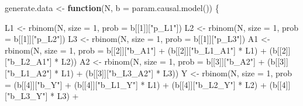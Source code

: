 \documentclass[
]{book}
\newenvironment{Shaded}{\begin{snugshade}}{\end{snugshade}}
\newcommand{\AttributeTok}[1]{\textcolor[rgb]{0.77,0.63,0.00}{#1}}
\newcommand{\ControlFlowTok}[1]{\textcolor[rgb]{0.13,0.29,0.53}{\textbf{#1}}}
\newcommand{\DecValTok}[1]{\textcolor[rgb]{0.00,0.00,0.81}{#1}}
\newcommand{\FunctionTok}[1]{\textcolor[rgb]{0.00,0.00,0.00}{#1}}
\newcommand{\NormalTok}[1]{#1}
\newcommand{\OtherTok}[1]{\textcolor[rgb]{0.56,0.35,0.01}{#1}}
\newcommand{\SpecialCharTok}[1]{\textcolor[rgb]{0.00,0.00,0.00}{#1}}
\newcommand{\StringTok}[1]{\textcolor[rgb]{0.31,0.60,0.02}{#1}}
\begin{document}
\begin{Shaded}
\begin{Highlighting}[]
\NormalTok{generate.data }\OtherTok{\textless{}{-}} \ControlFlowTok{function}\NormalTok{(N, }\AttributeTok{b =}  \FunctionTok{param.causal.model}\NormalTok{()) \{}
  
\NormalTok{  L1 }\OtherTok{\textless{}{-}} \FunctionTok{rbinom}\NormalTok{(N, }\AttributeTok{size =} \DecValTok{1}\NormalTok{, }\AttributeTok{prob =}\NormalTok{ b[[}\DecValTok{1}\NormalTok{]][}\StringTok{"p\_L1"}\NormalTok{]) }
\NormalTok{  L2 }\OtherTok{\textless{}{-}} \FunctionTok{rbinom}\NormalTok{(N, }\AttributeTok{size =} \DecValTok{1}\NormalTok{, }\AttributeTok{prob =}\NormalTok{ b[[}\DecValTok{1}\NormalTok{]][}\StringTok{"p\_L2"}\NormalTok{])}
\NormalTok{  L3 }\OtherTok{\textless{}{-}} \FunctionTok{rbinom}\NormalTok{(N, }\AttributeTok{size =} \DecValTok{1}\NormalTok{, }\AttributeTok{prob =}\NormalTok{ b[[}\DecValTok{1}\NormalTok{]][}\StringTok{"p\_L3"}\NormalTok{])}
\NormalTok{  A1 }\OtherTok{\textless{}{-}} \FunctionTok{rbinom}\NormalTok{(N, }\AttributeTok{size =} \DecValTok{1}\NormalTok{, }\AttributeTok{prob =}\NormalTok{ b[[}\DecValTok{2}\NormalTok{]][}\StringTok{"b\_A1"}\NormalTok{] }\SpecialCharTok{+} 
\NormalTok{                 (b[[}\DecValTok{2}\NormalTok{]][}\StringTok{"b\_L1\_A1"}\NormalTok{] }\SpecialCharTok{*}\NormalTok{ L1) }\SpecialCharTok{+}\NormalTok{ (b[[}\DecValTok{2}\NormalTok{]][}\StringTok{"b\_L2\_A1"}\NormalTok{] }\SpecialCharTok{*}\NormalTok{ L2))}
\NormalTok{  A2 }\OtherTok{\textless{}{-}} \FunctionTok{rbinom}\NormalTok{(N, }\AttributeTok{size =} \DecValTok{1}\NormalTok{, }\AttributeTok{prob =}\NormalTok{ b[[}\DecValTok{3}\NormalTok{]][}\StringTok{"b\_A2"}\NormalTok{] }\SpecialCharTok{+} 
\NormalTok{                 (b[[}\DecValTok{3}\NormalTok{]][}\StringTok{"b\_L1\_A2"}\NormalTok{] }\SpecialCharTok{*}\NormalTok{ L1) }\SpecialCharTok{+}\NormalTok{ (b[[}\DecValTok{3}\NormalTok{]][}\StringTok{"b\_L3\_A2"}\NormalTok{] }\SpecialCharTok{*}\NormalTok{ L3))}
\NormalTok{  Y }\OtherTok{\textless{}{-}} \FunctionTok{rbinom}\NormalTok{(N, }\AttributeTok{size =} \DecValTok{1}\NormalTok{, }\AttributeTok{prob =}\NormalTok{ (b[[}\DecValTok{4}\NormalTok{]][}\StringTok{"b\_Y"}\NormalTok{] }\SpecialCharTok{+} 
\NormalTok{                                     (b[[}\DecValTok{4}\NormalTok{]][}\StringTok{"b\_L1\_Y"}\NormalTok{] }\SpecialCharTok{*}\NormalTok{ L1) }\SpecialCharTok{+} 
\NormalTok{                                     (b[[}\DecValTok{4}\NormalTok{]][}\StringTok{"b\_L2\_Y"}\NormalTok{] }\SpecialCharTok{*}\NormalTok{ L2) }\SpecialCharTok{+}
\NormalTok{                                     (b[[}\DecValTok{4}\NormalTok{]][}\StringTok{"b\_L3\_Y"}\NormalTok{] }\SpecialCharTok{*}\NormalTok{ L3) }\SpecialCharTok{+}  

\end{Highlighting}
\end{Shaded}
\end{document}
